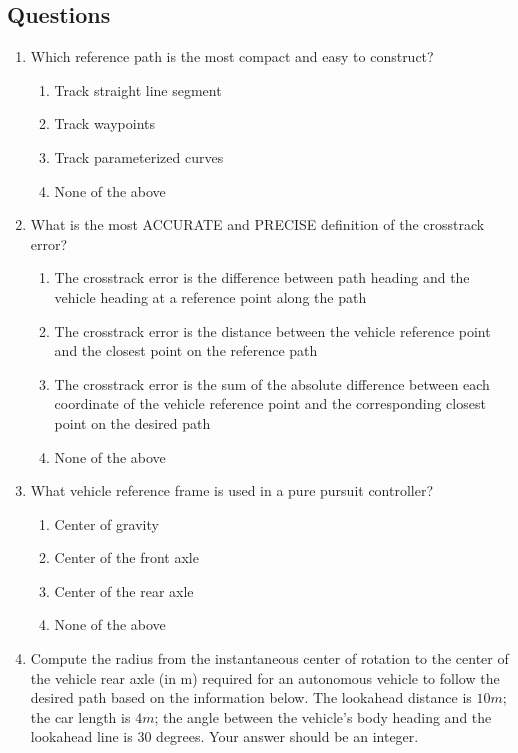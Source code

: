 \subsection{Questions}
\label{questions_lateral_control}

\begin{enumerate}
\item Which reference path is the most compact and easy to construct?
\begin{enumerate}
		\item Track straight line segment
		\item Track waypoints
		\item Track parameterized curves
		\item None of the above
	\end{enumerate}
	
\item What is the most ACCURATE and PRECISE definition of the crosstrack error?
	\begin{enumerate}
		\item   The crosstrack error is the difference between path heading and the vehicle heading at a reference point along the path
		\item The crosstrack error is the distance between the vehicle reference point and the closest point on the reference path
		\item The crosstrack error is the sum of the absolute difference between each coordinate of the vehicle reference point and the corresponding closest point on the desired path
		\item None of the above
	\end{enumerate}
\item What vehicle reference frame is used in a pure pursuit controller?
	\begin{enumerate}
		\item  Center of gravity
		\item Center of the front axle
		\item Center of the rear axle
		\item None of the above
	\end{enumerate}
\item Compute the radius from the instantaneous center of rotation to the center of the vehicle rear axle (in m) required for an autonomous vehicle to follow the desired path based on the information below. The lookahead distance is $10m$; the car length is $4m$; the angle between the vehicle’s body heading 
and the lookahead line is 30 degrees. Your answer should be an integer. 


\end{enumerate}
